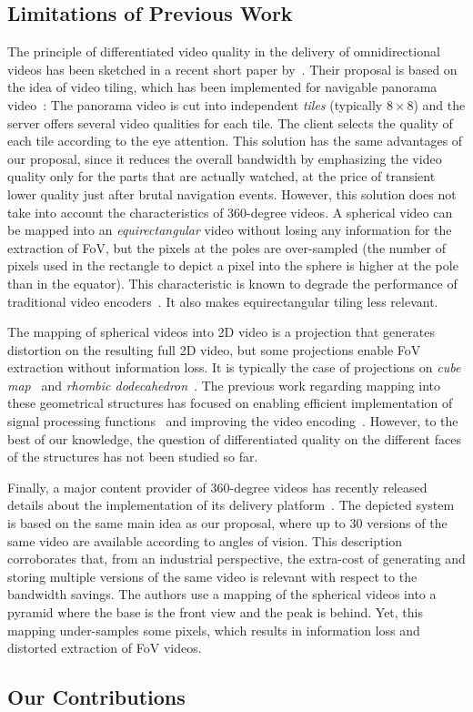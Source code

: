 \subsection{Limitations of Previous Work}

The principle of differentiated video quality in the delivery of omnidirectional videos has been sketched 
in a recent short paper by~\citet{ochi_live_2015}. Their proposal is based on the idea of video
tiling, which has been implemented for navigable panorama 
video~\cite{sanchez_compressed_2015,wang_mixing_2014,gaddam_tiling_2015}: The panorama video 
is cut into independent \emph{tiles} (typically $8\times 8$) and the server offers several
video qualities for each tile. The client selects the quality of each tile according to the eye attention. This
solution has the same advantages of our proposal, since it reduces the overall bandwidth by emphasizing
the video quality only for the parts that are actually watched, at the price of transient lower quality just after
brutal navigation events. However, this solution does not take into account the characteristics of 360-degree
videos. A spherical video can be mapped into an \emph{equirectangular} video without losing any information
for the extraction of \ac{FoV}, but the pixels at the poles are over-sampled (the number of pixels
used in the rectangle to depict a pixel into the sphere is higher at the pole than in the equator). 
This characteristic is known to degrade the
performance of traditional video encoders~\cite{wojciechowski_h.264_2006,yu_framework_2015}. It also 
makes equirectangular tiling less relevant.

The mapping of spherical videos into 2D video is a projection that generates distortion on the resulting
full 2D video, but some projections enable \ac{FoV} extraction without information loss. It is typically the case of 
projections on \emph{cube map}~\cite{Ng2005} and 
\emph{rhombic dodecahedron}~\cite{fu_rhombic_2009}. The previous work regarding mapping into these
geometrical structures has focused on enabling efficient implementation of signal processing 
functions~\cite{kazhdan_metric-aware_2010} and improving the video encoding~\cite{tosic_low_2009}. 
However, to the best of our knowledge, the 
question of differentiated quality on the different faces of the structures has not been studied so far.

Finally, a major content provider of 360-degree videos has recently released details about the 
implementation of its delivery platform~\cite{facebook}. The depicted system is based on the same
main idea as our proposal, where up to 30 versions of the same video are available according to angles
of vision. This description corroborates that, from an industrial perspective, the extra-cost of
generating and storing multiple versions of the same video is relevant with respect to the bandwidth
savings. The authors use a mapping of the spherical videos into a pyramid where the base is the front
view and the peak is behind. Yet, this mapping under-samples some pixels, which results in 
information loss and distorted extraction of \ac{FoV} videos.

\subsection{Our Contributions}


